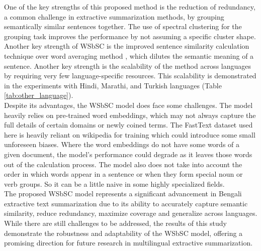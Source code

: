 \documentclass[acmlarge]{acmart}
\begin{document}
One of the key strengths of this proposed method is the reduction of redundancy, a common challenge in extractive summarization methods, by grouping semantically similar sentences together. The use of spectral clustering for the grouping task improves the performance by not assuming a specific cluster shape. Another key strength of WSbSC is the improved sentence similarity calculation technique over word averaging method \cite{roychowdhury-etal-2022-spectral-base}, which dilutes the semantic meaning of a sentence. Another key strength is the scalability of the method across languages by requiring very few language-specific resources. This scalability is demonstrated in the experiments with Hindi, Marathi, and Turkish languages (Table \ref{tab:other_language}).\\

Despite its advantages, the WSbSC model does face some challenges. The model heavily relies on pre-trained word embeddings, which may not always capture the full details of certain domains or newly coined terms. The FastText \cite{grave-etal-2018-fasttext} dataset used here is heavily reliant on wikipedia for training which could introduce some small unforeseen biases. Where the word embeddings do not have some words of a given document, the model’s performance could degrade as it leaves those words out of the calculation process. The model also does not take into account the order in which words appear in a sentence or when they form special noun or verb groups. So it can be a little naive in some highly specialized fields.\\

The proposed WSbSC model represents a significant advancement in Bengali extractive text summarization due to its ability to accurately capture semantic similarity, reduce redundancy, maximize coverage and generalize across languages. While there are still challenges to be addressed, the results of this study demonstrate the robustness and adaptability of the WSbSC model, offering a promising direction for future research in multilingual extractive summarization.
\end{document}
